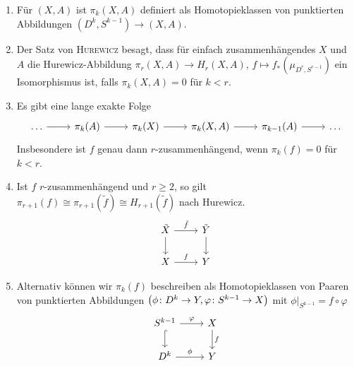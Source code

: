 \begin{bemerkung}
	\begin{enumerate}[1)]
		\item Für $(X,A)$ ist $\pi_k(X,A)$ definiert als Homotopieklassen von punktierten Abbildungen $(D^k,S^{k-1}) \to (X,A)$.
		\item Der Satz von \textsc{Hurewicz} besagt, dass für einfach zusammenhängendes $X$ und $A$ die Hurewicz-Abbildung $\pi_r (X,A) \to H_r(X,A)$, $f \mapsto f_* (\mu_{D^r,S^{r-1}})$ ein Isomorphismus ist, falls $\pi_k(X,A)=0$ für $k < r$.
		\item Es gibt eine lange exakte Folge
		\[
			\begin{tikzcd}
				\ldots \rar & \pi_k(A) \rar & \pi_k(X) \rar & \pi_k(X,A) \rar & \pi_{k-1}(A) \rar & \ldots 
			\end{tikzcd}
		\]
		Insbesondere ist $f$ genau dann $r$-zusammenhängend, wenn $\pi_k(f)=0$ für $k <r$.
		\item Ist $f$ $r$-zusammenhängend und $r \ge 2$, so gilt $\pi_{r+1}(f) \cong \pi_{r+1}(\tilde{f}) \cong H_{r+1}(\tilde{f})$ nach Hurewicz.
		\[
			\begin{tikzcd}
				\tilde{X} \rar["\tilde{f}"] \dar & \tilde{Y} \dar \\
				X \rar["f"] & Y
			\end{tikzcd}
		\]
		\item Alternativ können wir $\pi_k(f)$ beschreiben als Homotopieklassen von Paaren von punktierten Abbildungen $\enbrace*{\phi \colon D^k \to Y, \varphi \colon S^{k-1} \to X}$ mit $\phi|_{S^{k-1}} = f \circ \varphi$
		\[
			\begin{tikzcd}
				S^{k-1} \dar[hook] \rar["\varphi"] & X \dar["f"] \\
				D^k \rar["\phi"] & Y
			\end{tikzcd}
		\]
	\end{enumerate}
\end{bemerkung}

